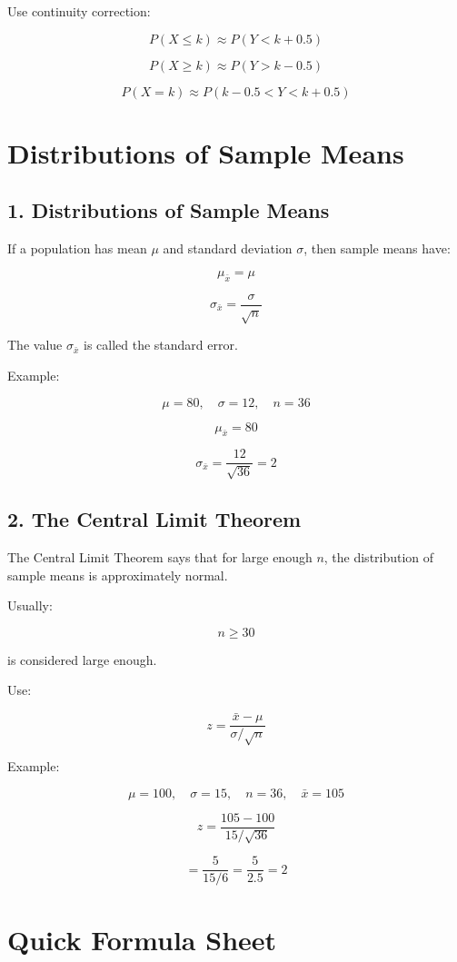 \documentclass[11pt]{article}
\begin{document}
Use continuity correction:

\[
P(X\le k)\approx P(Y<k+0.5)
\]

\[
P(X\ge k)\approx P(Y>k-0.5)
\]

\[
P(X=k)\approx P(k-0.5<Y<k+0.5)
\]

\section*{Distributions of Sample Means}

\subsection*{1. Distributions of Sample Means}

If a population has mean \(\mu\) and standard deviation \(\sigma\), then sample means have:

\[
\mu_{\bar{x}}=\mu
\]

\[
\sigma_{\bar{x}}=\frac{\sigma}{\sqrt{n}}
\]

The value \(\sigma_{\bar{x}}\) is called the standard error.

Example:

\[
\mu=80,\quad \sigma=12,\quad n=36
\]

\[
\mu_{\bar{x}}=80
\]

\[
\sigma_{\bar{x}}=\frac{12}{\sqrt{36}}=2
\]

\subsection*{2. The Central Limit Theorem}

The Central Limit Theorem says that for large enough \(n\), the distribution of sample means is approximately normal.

Usually:

\[
n\ge30
\]

is considered large enough.

Use:

\[
z=\frac{\bar{x}-\mu}{\sigma/\sqrt{n}}
\]

Example:

\[
\mu=100,\quad \sigma=15,\quad n=36,\quad \bar{x}=105
\]

\[
z=
\frac{105-100}{15/\sqrt{36}}
\]

\[
=\frac{5}{15/6}
=\frac{5}{2.5}=2
\]

\section*{Quick Formula Sheet}
\end{document}
